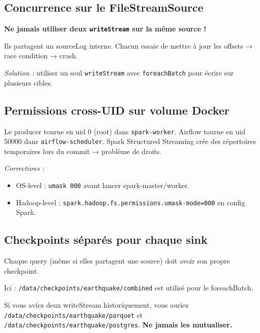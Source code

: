 \documentclass[12pt, a4paper]{article}
\begin{document}
\subsection{Concurrence sur le FileStreamSource}

\begin{tcolorbox}[colback=red!5, title=Piège courant]
  \textbf{Ne jamais utiliser deux \texttt{writeStream} sur la même source !}

  Ils partagent un sourceLog interne. Chacun essaie de mettre à jour les offsets → race condition → crash.

  \textit{Solution :} utiliser un seul \texttt{writeStream} avec \texttt{foreachBatch} pour écrire sur plusieurs cibles.
\end{tcolorbox}

\subsection{Permissions cross-UID sur volume Docker}

\begin{tcolorbox}[colback=orange!5, title=Détail d'implémentation]
  Le producer tourne en uid 0 (root) dans \texttt{spark-worker}. Airflow tourne en uid 50000 dans \texttt{airflow-scheduler}. Spark Structured Streaming crée des répertoires temporaires lors du commit → problème de droits.

  \textit{Corrections :}
  \begin{itemize}
    \item OS-level : \texttt{umask 000} avant lancer spark-master/worker.
    \item Hadoop-level : \texttt{spark.hadoop.fs.permissions.umask-mode=000} en config Spark.
  \end{itemize}
\end{tcolorbox}

\subsection{Checkpoints séparés pour chaque sink}

\begin{tcolorbox}[colback=blue!5, title=Bonne pratique]
  Chaque query (même si elles partagent une source) doit avoir son propre checkpoint.

  Ici : \texttt{/data/checkpoints/earthquake/combined} est utilisé pour le foreachBatch.

  Si vous aviez deux writeStream historiquement, vous auriez \texttt{/data/checkpoints/earthquake/parquet} et \texttt{/data/checkpoints/earthquake/postgres}. \textbf{Ne jamais les mutualiser.}
\end{tcolorbox}
\end{document}
